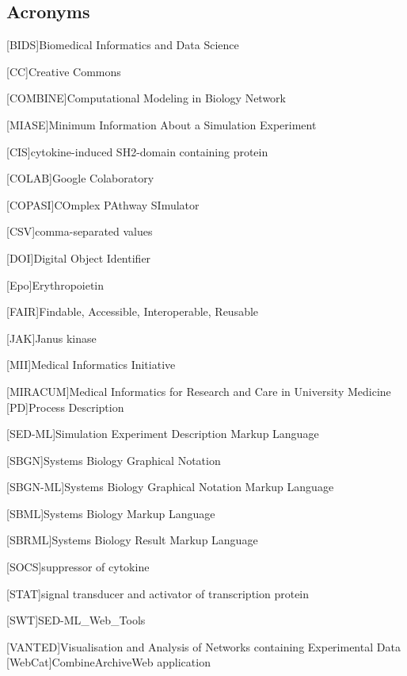 \subsection*{Acronyms}
    \begin{acronym}[acrmeta]
        
        [BIDS]{Biomedical Informatics and Data Science}
       
       [CC]{Creative Commons}
       
       
        [COMBINE]{Computational Modeling in Biology Network}
        
        [MIASE]{Minimum Information About a Simulation Experiment}
        
        [CIS]{cytokine-induced SH2-domain containing protein}
        
        [COLAB]{Google Colaboratory}
        
        [COPASI]{COmplex PAthway SImulator}
        
        [CSV]{comma-separated values}
        
        [DOI]{Digital Object Identifier}
        
        [Epo]{Erythropoietin}
        
        [FAIR]{Findable, Accessible, Interoperable, Reusable}
        
        [JAK]{Janus kinase}
        
        
        [MII]{Medical Informatics Initiative}
        
        [MIRACUM]{Medical Informatics for Research and Care in University
Medicine}
        [PD]{Process Description}
        
        [SED-ML]{Simulation Experiment Description Markup Language}
        
        [SBGN]{Systems Biology Graphical Notation}
        
        [SBGN-ML]{Systems Biology Graphical Notation Markup Language}
        
        [SBML]{Systems Biology Markup Language}
        
        [SBRML]{Systems Biology Result Markup Language}
        
        [SOCS]{suppressor of cytokine}
        
        [STAT]{signal transducer and activator of transcription protein}        
                
        [SWT]{SED-ML\_Web\_Tools}
        
        [VANTED]{Visualisation and Analysis of Networks containing Experimental Data}
        [WebCat]{CombineArchiveWeb application}

    \end{acronym}